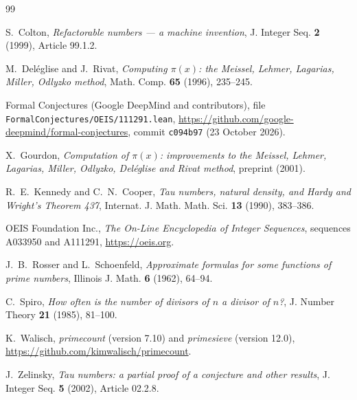 \documentclass[11pt,a4paper]{article}
\theoremstyle{definition}
\begin{document}
\begin{thebibliography}{99}

S.~Colton, \emph{Refactorable numbers --- a machine invention}, J. Integer Seq. \textbf{2} (1999), Article 99.1.2.

M.~Deléglise and J.~Rivat, \emph{Computing $\pi(x)$: the Meissel, Lehmer, Lagarias, Miller, Odlyzko method}, Math. Comp. \textbf{65} (1996), 235--245.

Formal Conjectures (Google DeepMind and contributors), file \texttt{FormalConjectures/OEIS/111291.lean}, \url{https://github.com/google-deepmind/formal-conjectures}, commit \texttt{c094b97} (23 October 2026).

X.~Gourdon, \emph{Computation of $\pi(x)$: improvements to the Meissel, Lehmer, Lagarias, Miller, Odlyzko, Deléglise and Rivat method}, preprint (2001).

R.~E.~Kennedy and C.~N.~Cooper, \emph{Tau numbers, natural density, and Hardy and Wright's Theorem 437}, Internat. J. Math. Math. Sci. \textbf{13} (1990), 383--386.

OEIS Foundation Inc., \emph{The On-Line Encyclopedia of Integer Sequences}, sequences A033950 and A111291, \url{https://oeis.org}.

J.~B.~Rosser and L.~Schoenfeld, \emph{Approximate formulas for some functions of prime numbers}, Illinois J. Math. \textbf{6} (1962), 64--94.

C.~Spiro, \emph{How often is the number of divisors of $n$ a divisor of $n$?}, J. Number Theory \textbf{21} (1985), 81--100.

K.~Walisch, \emph{primecount} (version 7.10) and \emph{primesieve} (version 12.0), \url{https://github.com/kimwalisch/primecount}.

J.~Zelinsky, \emph{Tau numbers: a partial proof of a conjecture and other results}, J. Integer Seq. \textbf{5} (2002), Article 02.2.8.

\end{thebibliography}
\end{document}
